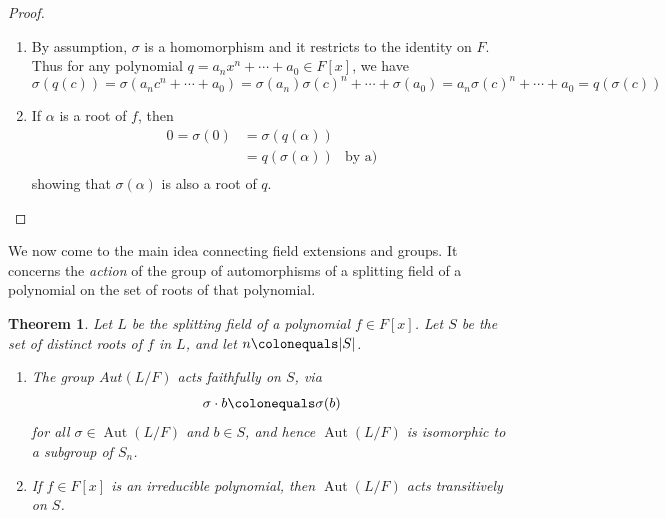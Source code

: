 \documentclass[12pt]{report}
\newtheorem{theorem}{Theorem}[chapter]
\numberwithin{equation}{section}
\numberwithin{theorem}{chapter}
\theoremstyle{definition}
\newtheorem*{basic properties}{Basic Properties}
\newtheorem*{Important Remark}{Important Remark}
\DeclareMathOperator{\Aut}{Aut}
\begin{document}
\begin{proof}$\,$
\begin{enumerate}[label=\alph*),leftmargin=15pt]
\item By assumption, $\sigma$ is a homomorphism and it restricts to the identity on $F$. Thus for any polynomial $q = a_nx^n + \cdots + a_0 \in F[x]$, we have
$$\sigma(q(c)) = \sigma(a_n c^n + \cdots + a_0) = \sigma(a_n) \sigma(c)^n + \cdots + \sigma(a_0) = a_n \sigma(c)^n + \cdots + a_0 = q(\sigma(c))$$
\item If $\alpha$ is a root of $f$, then
$$\begin{aligned}
0 = \sigma(0) & = \sigma(q(\alpha)) \\
& = q(\sigma(\alpha)) & \textrm{by a)}\\
\end{aligned}$$
showing that $\sigma(\alpha)$ is also a root of $q$.\qedhere
\end{enumerate}
\end{proof}

We now come to the main idea connecting field extensions and groups. It concerns the {\em action} of the group of automorphisms of a splitting field of a polynomial on the set of roots of that polynomial.

\begin{theorem}\label{aut splitting field sn}
Let $L$ be the splitting field of a polynomial $f \in F[x]$. Let $S$ be the set of distinct roots of $f$ in $L$, and let $n \colonequals |S|$. 

\begin{enumerate}[label=\alph*),leftmargin=15pt]
\item The group $Aut(L/F)$ acts faithfully on $S$, via 
$$\sigma \cdot b \colonequals \sigma(b)$$
for all $\sigma \in \Aut(L/F)$ and $b \in S$, and hence $\Aut(L/F)$ is isomorphic to a subgroup of $S_n$. 
\item If $f \in F[x]$ is an irreducible polynomial, then $\Aut(L/F)$ acts transitively on $S$.
\end{enumerate}
\end{theorem}
\end{document}
